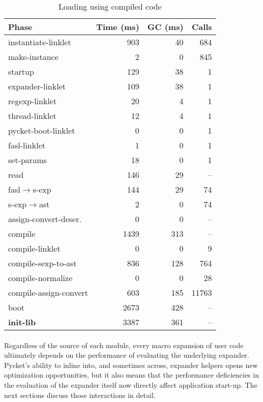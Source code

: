 		\begin{table}[!h]
		\centering
		\small
		\begin{tabular}{@{}lrrr@{}}
			\toprule
			Phase & Time (ms) & GC (ms) & Calls \\ \midrule
			instantiate-linklet            &    903 &   40 & 684 \\
			make-instance                  &      2 &    0 & 845 \\
			startup                        &    129 &   38 & 1 \\
			\quad expander-linklet         &    109 &   38 & 1 \\
			\quad regexp-linklet                 &     20 &    4 & 1 \\
			\quad thread-linklet                 &     12 &    4 & 1 \\
			\quad pycket-boot-linklet            &      0 &    0 & 1 \\
			\quad fasl-linklet             &      1 &    0 & 1 \\
			\quad set-params               &     18 &    0 & 1 \\ \midrule
			read                           &    146 &   29 & -- \\
			\quad fasl$\rightarrow$s-exp   &    144 &   29 & 74 \\
			\quad s-exp$\rightarrow$ast    &      2 &    0 & 74 \\
			\quad assign-convert-deser.    &      0 &    0 & -- \\ \midrule
			compile                        &   1439 &  313 & -- \\
			\quad compile-linklet          &      0 &    0 & 9 \\
			\quad compile-sexp-to-ast      &    836 &  128 & 764 \\
			\quad compile-normalize        &      0 &    0 & 28 \\
			\quad compile-assign-convert   &    603 &  185 & 11763 \\ \midrule
			boot                 		   &   2673 &  428 & -- \\
			\textbf{init-lib}			   &	3387 &   361 & -- \\
			\bottomrule
		\end{tabular}
		\caption{Loading  using compiled code}
		\label{table:boot-compiled}
		\end{table}

		\paragraph{}%
			Regardless of the source of each module, every macro expansion of user code ultimately depends on the performance of evaluating the underlying expander. Pycket's ability to inline into, and sometimes across, expander helpers opens new optimization opportunities, but it also means that the performance deficiencies in the evaluation of the expander itself now directly affect application start-up. The next sections discuss those interactions in detail.

